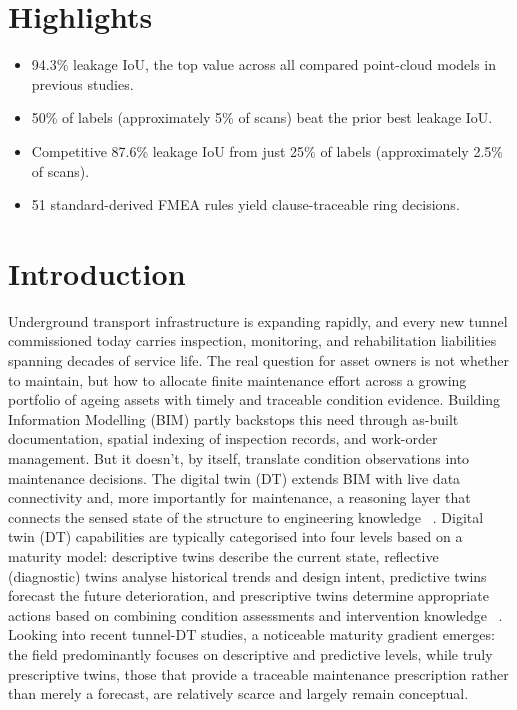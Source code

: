 \documentclass[preprint,12pt,authoryear]{elsarticle}
\begin{document}
\section*{Highlights}
\begin{itemize}
\item 94.3\% leakage IoU, the top value across all compared point-cloud models in previous studies.
\item 50\% of labels (approximately 5\% of scans) beat the prior best leakage IoU.
\item Competitive 87.6\% leakage IoU from just 25\% of labels (approximately 2.5\% of scans).
\item 51 standard-derived FMEA rules yield clause-traceable ring decisions.
\end{itemize}

\section{Introduction}\label{introduction}

Underground transport infrastructure is expanding rapidly, and every new
tunnel commissioned today carries inspection, monitoring, and
rehabilitation liabilities spanning decades of service life. The real
question for asset owners is not whether to maintain, but how to
allocate finite maintenance effort across a growing portfolio of ageing
assets with timely and traceable condition evidence. Building
Information Modelling (BIM) partly backstops this need through as-built
documentation, spatial indexing of inspection records, and work-order
management. But it doesn't, by itself, translate condition observations
into maintenance decisions. The digital twin (DT) extends BIM with live
data connectivity and, more importantly for maintenance, a reasoning
layer that connects the sensed state of the structure to engineering
knowledge ~\citep{Grieves2017, Tao2019a}. Digital twin
(DT) capabilities are typically categorised into four levels based on a
maturity model: descriptive twins describe the current state, reflective
(diagnostic) twins analyse historical trends and design intent,
predictive twins forecast the future deterioration, and prescriptive
twins determine appropriate actions based on combining condition
assessments and intervention knowledge ~\citep{Babanagar2025,Zhu2025}. 
Looking into recent tunnel-DT studies, a noticeable maturity
gradient emerges: the field predominantly focuses on descriptive and
predictive levels, while truly prescriptive twins, those that provide a
traceable maintenance prescription rather than merely a forecast, are
relatively scarce and largely remain conceptual.
\end{document}
